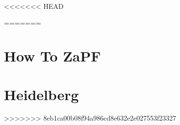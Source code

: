 \documentclass[ngerman,a5paper]{scrbook}
\begin{document}
\setcounter{tocdepth}{1} %
\tableofcontents

<<<<<<< HEAD




=======
\chapter{How To ZaPF}



\chapter{Heidelberg}

>>>>>>> 8eb1ca00b08f94a986cd8e632e2e027553f23327
\end{document}
